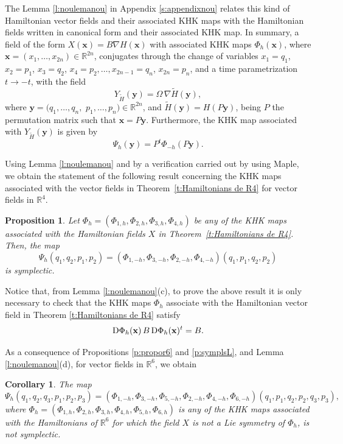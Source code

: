 \documentclass[11pt]{article}
\newtheorem {proposition} [theorem]{Proposition}
\newtheorem {corollary} [theorem]{Corollary}
\begin{document}
The Lemma \ref{l:noulemanou} in Appendix \ref{s:appendixnou} relates this kind of Hamiltonian vector fields and their associated KHK maps with the Hamiltonian fields written in canonical form and their associated KHK map. In summary, a field of the form $X(\mathbf{x})=B\nabla H(\mathbf{x})$ with associated KHK maps $\Phi_h(\mathbf{x})$, where $\mathbf{x}=(x_1,\ldots,x_{2n})\in\mathbb{R}^{2n}$,
conjugates through the change of variables
$x_1=q_1$, $x_2=p_1$, $x_3=q_2$, $x_4=p_2,\ldots,x_{2n-1}=q_n$, $x_{2n}=p_n$, and a time parametrization $t\to -t$, with the field  $$Y_{\tilde{H}}(\mathbf{y})=\Omega\,\nabla \tilde{H}(\mathbf{y}),$$ where $\mathbf{y}=(q_1,\ldots,q_{n},$ $p_1,\ldots,p_{n})\in\mathbb{R}^{2n}$, and
$\tilde{H}(\mathbf{y})=H(P\mathbf{y})$, being $P$ the permutation matrix such that $\mathbf{x}=P\mathbf{y}$. Furthermore, the KHK map associated with $Y_{\tilde{H}}(\mathbf{y})$ is given by $$\Psi_h(\mathbf{y})=P^t\Phi_{-h}(P\mathbf{y}).$$


Using Lemma \ref{l:noulemanou} and by a verification carried out by using Maple, we obtain the statement of the following result concerning the KHK maps associated with the vector fields  in Theorem~\ref{t:Hamiltonians de R4} for vector fields in $\mathbb{R}^4$.



\begin{proposition}\label{p:totesymplectiquesr4}
Let $\Phi_h=\left(\Phi _{1,h},\Phi _{2,h},\Phi _{3,h},\Phi _{4,h}\right)$ be any of the KHK maps associated with the Hamiltonian fields $X$ in Theorem~\ref{t:Hamiltonians de R4}. Then, the map $${\Psi}_{h}(q_1,q_2,p_1,p_2)=\left(\Phi _{1,-h},\Phi _{3,-h},\Phi _{2,-h},\Phi _{4,-h}\right)(q_1,p_1,q_2,p_2)$$ is symplectic.
\end{proposition}
Notice that, from Lemma \ref{l:noulemanou}(c), to prove the above result it is only necessary to check that the KHK maps $\Phi_{h}$ associate with the Hamiltonian vector field in Theorem \ref{t:Hamiltonians de R4} satisfy
\begin{equation}\label{e:equacioambB}
{\mathrm D}\Phi_h({\bf{x}})\,B\,{\mathrm D}\Phi_h({\bf{x}})^t=B.
\end{equation}



\smallskip


As a consequence of  Propositions \ref{p:propor6} and \ref{p:symplsL}, and Lemma \ref{l:noulemanou}(d), for vector fields in $\mathbb{R}^6$, we obtain
\begin{corollary}\label{c:corolarinosimplr6}
The map $${\Psi}_h(q_1,q_2,q_3,p_1,p_2,p_3)=\left(\Phi _{1,-h},\Phi _{3,-h},\Phi _{5,-h},\Phi _{2,-h},\Phi _{4,-h},\Phi _{6,-h}\right)(q_1,p_1,q_2,p_2,q_3,p_3),$$ whe\-re $\Phi_h=\left(\Phi _{1,h},\Phi _{2,h},\Phi _{3,h},\Phi _{4,h},\Phi _{5,h},\Phi _{6,h}\right)$ is any of the  KHK maps associated with the Hamiltonians of $\mathbb{R}^6$ for which the field $X$ is not a Lie symmetry of $\Phi_h$, is not symplectic.
\end{corollary}
\end{document}
